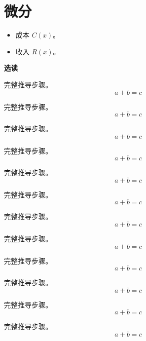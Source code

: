 \documentclass{ctexart}
\newenvironment{extra}{\par\textbf{选读}}{\par}
\begin{document}
\section{微分}
\begin{center}\end{center}
\begin{itemize}[leftmargin=2em]\item 成本 $C(x)$。\item 收入 $R(x)$。\end{itemize}
\begin{extra}\begin{proofdetail}
完整推导步骤。\[a+b=c\]

完整推导步骤。\[a+b=c\]

完整推导步骤。\[a+b=c\]

完整推导步骤。\[a+b=c\]

完整推导步骤。\[a+b=c\]

完整推导步骤。\[a+b=c\]

完整推导步骤。\[a+b=c\]

完整推导步骤。\[a+b=c\]

完整推导步骤。\[a+b=c\]

完整推导步骤。\[a+b=c\]

完整推导步骤。\[a+b=c\]

完整推导步骤。\[a+b=c\]

\end{proofdetail}\end{extra}
\end{document}
